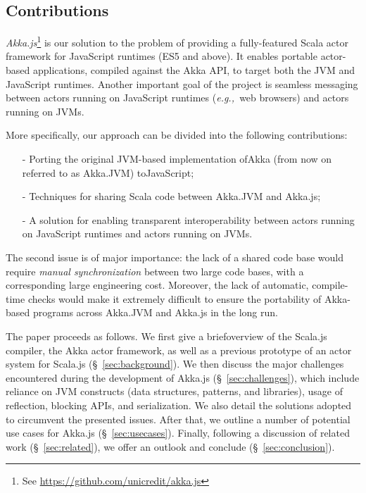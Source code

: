 \documentclass{sig-alternate}
\newcommand{\eg}{{\em e.g.,~}}
\begin{document}
\subsection{Contributions}

{\em Akka.js}\footnote{See \url{https://github.com/unicredit/akka.js}} is our solution to the problem of providing a fully-featured Scala actor framework for JavaScript runtimes (ES5 and above). It enables portable actor-based applications, compiled against the Akka API, to target both the JVM and JavaScript runtimes. Another important goal of the project is seamless messaging between actors running on JavaScript runtimes (\eg web browsers) and actors running on JVMs.

More specifically, our approach can be divided into the following contributions:
\begin{itemize}
	\item[-] Porting the original JVM-based implementation of\newline Akka (from now on referred to as Akka.JVM) to\newline JavaScript;
	\item[-] Techniques for sharing Scala code between Akka.JVM and Akka.js;
    \item[-] A solution for enabling transparent interoperability between actors running on JavaScript runtimes and actors running on JVMs.
\end{itemize}
\noindent
The second issue is of major importance: the lack of a shared code base would require {\em manual synchronization} between two large code bases, with a corresponding large engineering cost. Moreover, the lack of automatic, compile-time checks would make it extremely difficult to ensure the portability of Akka-based programs across Akka.JVM and Akka.js in the long run.

The paper proceeds as follows. We first give a brief\newline overview of the Scala.js compiler, the Akka actor framework, as well as a previous prototype of an actor system for Scala.js (\S~\ref{sec:background}). We then discuss the major challenges encountered during the development of Akka.js (\S~\ref{sec:challenges}), which include reliance on JVM constructs (data structures, patterns, and libraries), usage of reflection, blocking APIs, and serialization. We also detail the solutions adopted to circumvent the presented issues. After that, we outline a number of potential use cases for Akka.js (\S~\ref{sec:usecases}). Finally, following a discussion of related work (\S~\ref{sec:related}), we offer an outlook and conclude (\S~\ref{sec:conclusion}).
\end{document}
